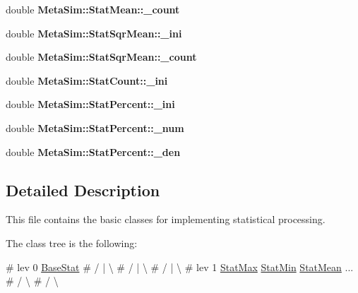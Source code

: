 \begin{DoxyCompactItemize}
\item 
double {\bfseries Meta\+Sim\+::\+Stat\+Mean\+::\+\_\+count}\hypertarget{group__metasim__stat_gaaaddd915949d343ca10f76ae7a429df5}{}\label{group__metasim__stat_gaaaddd915949d343ca10f76ae7a429df5}

\item 
double {\bfseries Meta\+Sim\+::\+Stat\+Sqr\+Mean\+::\+\_\+ini}\hypertarget{group__metasim__stat_ga1e8ebaf99cdd6df6ecf160db459be265}{}\label{group__metasim__stat_ga1e8ebaf99cdd6df6ecf160db459be265}

\item 
double {\bfseries Meta\+Sim\+::\+Stat\+Sqr\+Mean\+::\+\_\+count}\hypertarget{group__metasim__stat_ga813c9f8e174f93f928a14229d6b5cc73}{}\label{group__metasim__stat_ga813c9f8e174f93f928a14229d6b5cc73}

\item 
double {\bfseries Meta\+Sim\+::\+Stat\+Count\+::\+\_\+ini}\hypertarget{group__metasim__stat_gab3d6ce84aa9374f3d3d6acf262b266e4}{}\label{group__metasim__stat_gab3d6ce84aa9374f3d3d6acf262b266e4}

\item 
double {\bfseries Meta\+Sim\+::\+Stat\+Percent\+::\+\_\+ini}\hypertarget{group__metasim__stat_gac0c0d0de959d19ef21b0c7409bd9d396}{}\label{group__metasim__stat_gac0c0d0de959d19ef21b0c7409bd9d396}

\item 
double {\bfseries Meta\+Sim\+::\+Stat\+Percent\+::\+\_\+num}\hypertarget{group__metasim__stat_ga29ff08fe3b1245a8742e32121061e17d}{}\label{group__metasim__stat_ga29ff08fe3b1245a8742e32121061e17d}

\item 
double {\bfseries Meta\+Sim\+::\+Stat\+Percent\+::\+\_\+den}\hypertarget{group__metasim__stat_ga13ac7544eefa57cd8d204a1304240875}{}\label{group__metasim__stat_ga13ac7544eefa57cd8d204a1304240875}

\end{DoxyCompactItemize}


\subsection{Detailed Description}
This file contains the basic classes for implementing statistical processing.

The class tree is the following\+: 
\begin{DoxyPre}
\# lev 0             \hyperlink{classMetaSim_1_1BaseStat}{BaseStat}                      
\#                /     |       \textbackslash{}                  
\#               /      |        \textbackslash{}                 
\#              /       |         \textbackslash{}                
\# lev 1     \hyperlink{classMetaSim_1_1StatMax}{StatMax}   \hyperlink{classMetaSim_1_1StatMin}{StatMin}   \hyperlink{classMetaSim_1_1StatMean}{StatMean} ...       
\#           /   \textbackslash{}                                  
\#          /     \textbackslash{}\end{DoxyPre}



